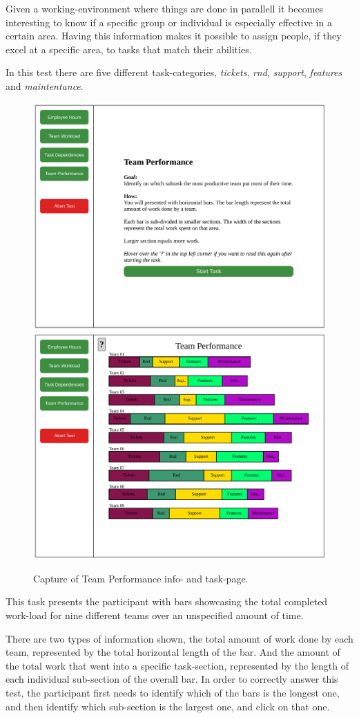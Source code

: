 \documentclass[nofilelist,dvipsnames]{cslthse-msc}
\begin{document}
{        \textit{\ideaFour}

        Given a working-environment where things are done in parallell it
        becomes interesting to know if a specific group or individual is
        especially effective in a certain area. Having this information makes
        it possible to assign people, if they excel at a specific area, to
        tasks that match their abilities.

        In this test there are five different task-categories,
        \textit{tickets},
        \textit{rnd},
        \textit{support},
        \textit{features} and
        \textit{maintentance}.

        \begin{figure}[h!]
          \centering
          \includegraphics[width=.49\textwidth]{figures/captures/webapp_team_performance_info.pdf}
          \includegraphics[width=.49\textwidth]{figures/captures/webapp_team_performance_task.pdf}
          \caption{Capture of Team Performance info- and task-page.}
        \end{figure}

        This task presents the participant with bars showcasing the total
        completed work-load for nine different teams over an unspecified amount
        of time.

        There are two types of information shown, the total amount of work done
        by each team, represented by the total horizontal length of the bar.
        And the amount of the total work that went into a specific
        task-section, represented by the length of each individual sub-section
        of the overall bar.
        In order to correctly answer this test, the participant first needs to
        identify which of the bars is the longest one, and then identify which
        sub-section is the largest one, and click on that one.

}
\end{document}
